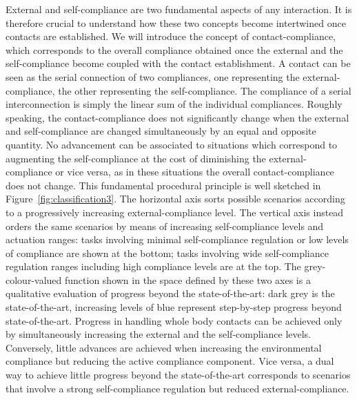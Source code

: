 \documentclass[final,5p,twocolumn]{elsarticle}
\begin{document}
External and self-compliance are two fundamental aspects of any interaction. It is therefore crucial to understand how these two concepts become intertwined once contacts are established. We will introduce the concept of contact-compliance, which corresponds to the overall compliance obtained once the external and the self-compliance become coupled with the contact establishment. A contact can be seen as the serial connection of two compliances, one representing the external-compliance, the other representing the self-compliance. The compliance of a serial interconnection is simply the linear sum of the individual compliances. Roughly speaking, the contact-compliance does not significantly change when the external and self-compliance are changed simultaneously by an equal and opposite quantity. No advancement can be associated to situations which correspond to augmenting the self-compliance at the cost of diminishing the external-compliance or vice versa, as in these situations the overall contact-compliance does not change. This fundamental procedural principle is well sketched in Figure~\ref{fig:classification3}. The horizontal axis sorts possible scenarios according to a progressively increasing external-compliance level. The vertical axis instead orders the same scenarios by means of increasing self-compliance levels and actuation ranges: tasks involving minimal self-compliance regulation or low levels of compliance are shown at the bottom; tasks involving wide self-compliance regulation ranges including high compliance levels are at the top. The grey-colour-valued function shown in the space defined by these two axes is a qualitative evaluation of progress beyond the state-of-the-art: dark grey is the state-of-the-art, increasing levels of blue represent step-by-step progress beyond state-of-the-art. Progress in handling whole body contacts can be achieved only by simultaneously increasing the external and the self-compliance levels. Conversely, little advances are achieved when increasing the environmental compliance but reducing the active compliance component. Vice versa, a dual way to achieve little progress beyond the state-of-the-art corresponds to scenarios that involve a strong self-compliance regulation but reduced external-compliance.  
\end{document}
